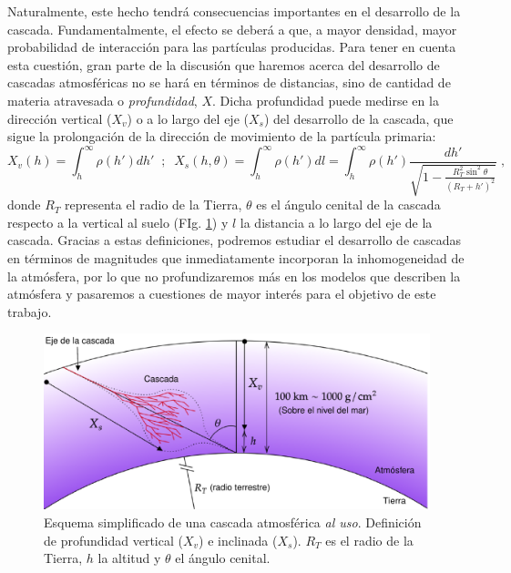 \documentclass[12 pt, a4paper]{article} %
\numberwithin{equation}{section}
\numberwithin{figure}{section}
\numberwithin{table}{section}
\begin{document}
Naturalmente, este hecho tendrá consecuencias importantes en el desarrollo de la cascada. Fundamentalmente, el efecto se deberá a que, a mayor densidad, mayor probabilidad de interacción para las partículas producidas. Para tener en cuenta esta cuestión, gran parte de la discusión que haremos acerca del desarrollo de cascadas atmosféricas no se hará en términos de distancias, sino de cantidad de materia atravesada o \textit{profundidad}, $X$. Dicha profundidad puede medirse en la dirección vertical ($X_v$) o a lo largo del eje ($X_s$) del desarrollo de la cascada, que sigue la prolongación de la dirección de movimiento de la partícula primaria:
\begin{equation}
	X_v(h)=\int_{h}^\infty\rho(h')dh'\;\;;\;\;X_s(h,\theta)=\int_{h}^\infty\rho(h')dl=\int_h^{\infty}\rho(h')\frac{dh'}{\sqrt{1-\frac{R_T^2\sin^2{\theta}}{\left(R_T+h'\right)^2}}}\;,\label{ec22}
\end{equation}
donde $R_T$ representa el radio de la Tierra, $\theta$ es el ángulo cenital de la cascada respecto a la vertical al suelo (FIg. \ref{shower_params}) y $l$ la distancia a lo largo del eje de la cascada. Gracias a estas definiciones, podremos estudiar el desarrollo de cascadas en términos de magnitudes que inmediatamente incorporan la inhomogeneidad de la atmósfera, por lo que no profundizaremos más en los modelos que describen la atmósfera y pasaremos a cuestiones de mayor interés para el objetivo de este trabajo.

\begin{figure}[H]
	\centering
	\includegraphics[width=.7\linewidth]{figures/cascadas/shower_params_v2}
	\caption{Esquema simplificado de una cascada atmosférica \textit{al uso}. Definición de profundidad vertical ($X_v$) e inclinada ($X_s$). $R_T$ es el radio de la Tierra, $h$ la altitud y $\theta$ el ángulo cenital.}
	\label{shower_params}
\end{figure}
\end{document}
